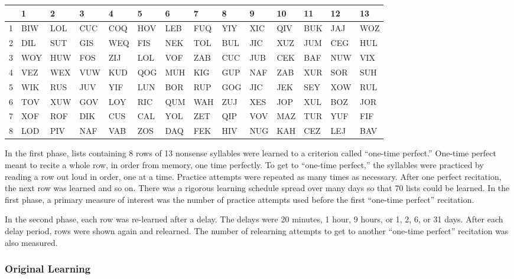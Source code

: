 \documentclass[
  oneside,
  12pt]{crumpbook}
\begin{document}
\begin{table}
\centering\begingroup\fontsize{9}{11}\selectfont

\begin{tabular}{r|l|l|l|l|l|l|l|l|l|l|l|l|l}
\hline
 & 1 & 2 & 3 & 4 & 5 & 6 & 7 & 8 & 9 & 10 & 11 & 12 & 13\\
\hline
1 & BIW & LOL & CUC & COQ & HOV & LEB & FUQ & YIY & XIC & QIV & BUK & JAJ & WOZ\\
\hline
2 & DIL & SUT & GIS & WEQ & FIS & NEK & TOL & BUL & JIC & XUZ & JUM & CEG & HUL\\
\hline
3 & WOY & HUW & FOS & ZIJ & LOL & VOF & ZAB & CUC & JUB & CEK & BAF & NUW & VIX\\
\hline
4 & VEZ & WEX & VUW & KUD & QOG & MUH & KIG & GUP & NAF & ZAB & XUR & SOR & SUH\\
\hline
5 & WIK & RUS & JUV & YIF & LUN & BOR & RUP & GOG & JIC & JEK & SEY & XOW & RUL\\
\hline
6 & TOV & XUW & GOV & LOY & RIC & QUM & WAH & ZUJ & XES & JOP & XUL & BOZ & JOR\\
\hline
7 & XOF & ROF & DIK & CUS & CAL & YOL & ZET & QIP & VOV & MAZ & TUR & YUF & FIF\\
\hline
8 & LOD & PIV & NAF & VAB & ZOS & DAQ & FEK & HIV & NUG & KAH & CEZ & LEJ & BAV\\
\hline
\end{tabular}
\endgroup{}
\end{table}

In the first phase, lists containing 8 rows of 13 nonsense syllables were learned to a criterion called ``one-time perfect.'' One-time perfect meant to recite a whole row, in order from memory, one time perfectly. To get to ``one-time perfect,'' the syllables were practiced by reading a row out loud in order, one at a time. Practice attempts were repeated as many times as necessary. After one perfect recitation, the next row was learned and so on. There was a rigorous learning schedule spread over many days so that 70 lists could be learned. In the first phase, a primary measure of interest was the number of practice attempts used before the first ``one-time perfect'' recitation.

In the second phase, each row was re-learned after a delay. The delays were 20 minutes, 1 hour, 9 hours, or 1, 2, 6, or 31 days. After each delay period, rows were shown again and relearned. The number of relearning attempts to get to another ``one-time perfect'' recitation was also measured.

\hypertarget{original-learning}{%
\subsubsection{Original Learning}\label{original-learning}}
\end{document}
